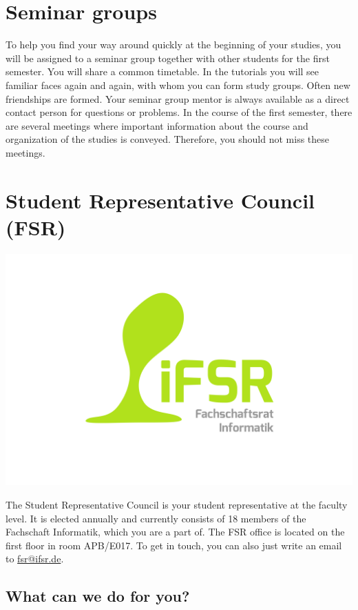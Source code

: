 \label{sec:seminargruppen}
\section*{Seminar groups}
To help you find your way around quickly at the beginning of your studies, you will be assigned to a seminar group together with other students for the first semester. You will share a common timetable. In the tutorials you will see familiar faces again and again, with whom you can form study groups. Often new friendships are formed. Your seminar group mentor is always available as a direct contact person for questions or problems. In the course of the first semester, there are several meetings where important information about the course and organization of the studies is conveyed. Therefore, you should not miss these meetings.

\label{sec:fachschaftsrat}
\section*{Student Representative Council (FSR)}

\includegraphics{img/fsr_logo.svg}

The Student Representative Council is your student representative at the faculty level.
It is elected annually and currently consists of 18 members of the Fachschaft Informatik, which you are a part of. 
The FSR office is located on the first floor in room APB/E017.
To get in touch, you can also just write an email to 
\href{mailto:fsr@ifsr.de}{fsr@ifsr.de}.

\subsection*{What can we do for you?} 

